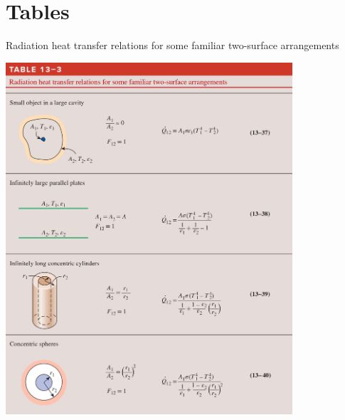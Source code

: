\section*{Tables}
\begin{table}[H]
    \centering
    \caption{Radiation heat transfer relations for some familiar two-surface arrangements}
    \includegraphics[width=0.8\textwidth]{Figures/Sec13 heat transfer enclosed.png}
    \label{tab:sec13_radiation_enclosure_relations}
\end{table}